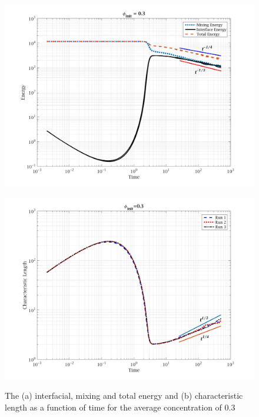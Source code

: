 \documentclass[a4paper,6pt]{article}
\begin{document}
\begin{figure}[H]
        \begin{minipage}[b]{.5\linewidth}       
                \centering
                \includegraphics[width=1\textwidth]{pics/E_c1.jpg}
                \subcaption{}
                \label{E_c1} 
        \end{minipage}
        \begin{minipage}[b]{.5\linewidth}
                \centering
                \includegraphics[width=1\textwidth]{pics/L_c1.jpg}
                \subcaption{}
                \label{L_c1}
        \end{minipage}
                \caption{The (a) interfacial, mixing and total energy and (b) characteristic length as a function of time for the average concentration of 0.3}
        \label{EL_c1}
\end{figure}
\end{document}
